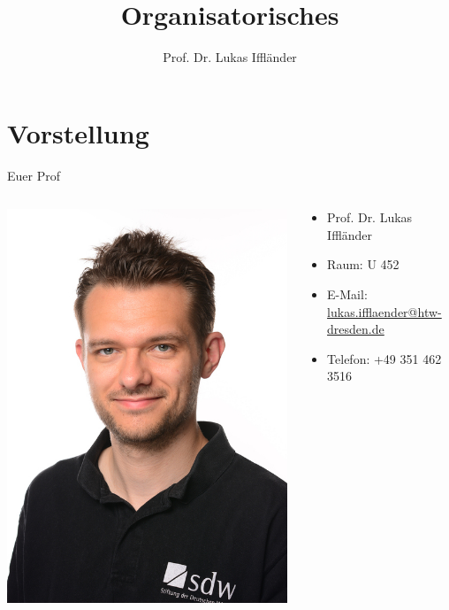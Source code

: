 \documentclass[xelatex,aspectratio=168]{beamer}
\title{Organisatorisches}
\author{Prof. Dr. Lukas Iffländer}
\institute{HTW Dresden}
\date{}
\begin{document}
\begin{frame}
  \titlepage
\end{frame}

\section{Vorstellung}

\begin{frame}{Euer Prof}
  \begin{columns}
    \begin{column}{.4\textwidth}
      \includegraphics[height=.8\textheight]{img/portrait.jpg}
    \end{column}
    \begin{column}{.5\textwidth}
      \begin{itemize}
        \item Prof. Dr. Lukas Iffländer
        \item Raum: U 452
        \item E-Mail: \url{lukas.ifflaender@htw-dresden.de}
        \item Telefon: +49 351 462 3516
      \end{itemize}
    \end{column}
  \end{columns}
\end{frame}
\end{document}
